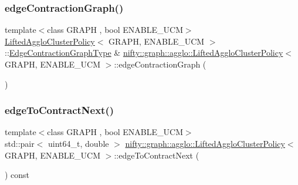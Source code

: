 \subsubsection{\texorpdfstring{edge\+Contraction\+Graph()}{edgeContractionGraph()}}
{\footnotesize\ttfamily template$<$class G\+R\+A\+PH , bool E\+N\+A\+B\+L\+E\+\_\+\+U\+CM$>$ \\
\hyperlink{classnifty_1_1graph_1_1agglo_1_1LiftedAggloClusterPolicy}{Lifted\+Agglo\+Cluster\+Policy}$<$ G\+R\+A\+PH, E\+N\+A\+B\+L\+E\+\_\+\+U\+CM $>$\+::\hyperlink{classnifty_1_1graph_1_1agglo_1_1LiftedAggloClusterPolicy_a2fb57e57cf31de0f2d446cfd17d263a7}{Edge\+Contraction\+Graph\+Type} \& \hyperlink{classnifty_1_1graph_1_1agglo_1_1LiftedAggloClusterPolicy}{nifty\+::graph\+::agglo\+::\+Lifted\+Agglo\+Cluster\+Policy}$<$ G\+R\+A\+PH, E\+N\+A\+B\+L\+E\+\_\+\+U\+CM $>$\+::edge\+Contraction\+Graph (\begin{DoxyParamCaption}{ }\end{DoxyParamCaption})\hspace{0.3cm}{\ttfamily [inline]}}

\mbox{\label{classnifty_1_1graph_1_1agglo_1_1LiftedAggloClusterPolicy_a7cf12b34af4a8de2b792a0f2042b2b70}} 
\subsubsection{\texorpdfstring{edge\+To\+Contract\+Next()}{edgeToContractNext()}}
{\footnotesize\ttfamily template$<$class G\+R\+A\+PH , bool E\+N\+A\+B\+L\+E\+\_\+\+U\+CM$>$ \\
std\+::pair$<$ uint64\+\_\+t, double $>$ \hyperlink{classnifty_1_1graph_1_1agglo_1_1LiftedAggloClusterPolicy}{nifty\+::graph\+::agglo\+::\+Lifted\+Agglo\+Cluster\+Policy}$<$ G\+R\+A\+PH, E\+N\+A\+B\+L\+E\+\_\+\+U\+CM $>$\+::edge\+To\+Contract\+Next (\begin{DoxyParamCaption}{ }\end{DoxyParamCaption}) const\hspace{0.3cm}{\ttfamily [inline]}}

\mbox{\label{classnifty_1_1graph_1_1agglo_1_1LiftedAggloClusterPolicy_a9ef227542d4e62bffa6f991ce64efe13}} 
